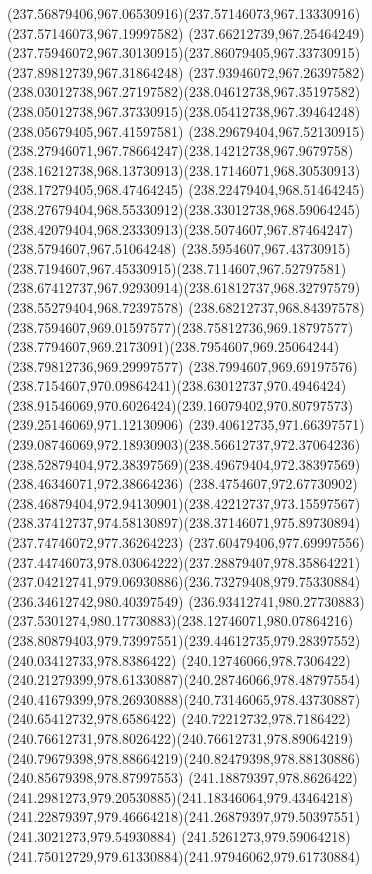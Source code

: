 {{  \curveto(237.56879406,967.06530916)(237.57146073,967.13330916)(237.57146073,967.19997582)
  \curveto(237.66212739,967.25464249)(237.75946072,967.30130915)(237.86079405,967.33730915)
  \lineto(237.89812739,967.31864248)
  \curveto(237.93946072,967.26397582)(238.03012738,967.27197582)(238.04612738,967.35197582)
  \curveto(238.05012738,967.37330915)(238.05412738,967.39464248)(238.05679405,967.41597581)
  \curveto(238.29679404,967.52130915)(238.27946071,967.78664247)(238.14212738,967.9679758)
  \curveto(238.16212738,968.13730913)(238.17146071,968.30530913)(238.17279405,968.47464245)
  \curveto(238.22479404,968.51464245)(238.27679404,968.55330912)(238.33012738,968.59064245)
  \curveto(238.42079404,968.23330913)(238.5074607,967.87464247)(238.5794607,967.51064248)
  \curveto(238.5954607,967.43730915)(238.7194607,967.45330915)(238.7114607,967.52797581)
  \curveto(238.67412737,967.92930914)(238.61812737,968.32797579)(238.55279404,968.72397578)
  \curveto(238.68212737,968.84397578)(238.7594607,969.01597577)(238.75812736,969.18797577)
  \curveto(238.7794607,969.2173091)(238.7954607,969.25064244)(238.79812736,969.29997577)
  \curveto(238.7994607,969.69197576)(238.7154607,970.09864241)(238.63012737,970.4946424)
  \curveto(238.91546069,970.6026424)(239.16079402,970.80797573)(239.25146069,971.12130906)
  \curveto(239.40612735,971.66397571)(239.08746069,972.18930903)(238.56612737,972.37064236)
  \curveto(238.52879404,972.38397569)(238.49679404,972.38397569)(238.46346071,972.38664236)
  \curveto(238.4754607,972.67730902)(238.46879404,972.94130901)(238.42212737,973.15597567)
  \curveto(238.37412737,974.58130897)(238.37146071,975.89730894)(237.74746072,977.36264223)
  \curveto(237.60479406,977.69997556)(237.44746073,978.03064222)(237.28879407,978.35864221)
  \curveto(237.04212741,979.06930886)(236.73279408,979.75330884)(236.34612742,980.40397549)
  \curveto(236.93412741,980.27730883)(237.5301274,980.17730883)(238.12746071,980.07864216)
  \curveto(238.80879403,979.73997551)(239.44612735,979.28397552)(240.03412733,978.8386422)
  \curveto(240.12746066,978.7306422)(240.21279399,978.61330887)(240.28746066,978.48797554)
  \curveto(240.41679399,978.26930888)(240.73146065,978.43730887)(240.65412732,978.6586422)
  \curveto(240.72212732,978.7186422)(240.76612731,978.8026422)(240.76612731,978.89064219)
  \curveto(240.79679398,978.88664219)(240.82479398,978.88130886)(240.85679398,978.87997553)
  \curveto(241.18879397,978.8626422)(241.2981273,979.20530885)(241.18346064,979.43464218)
  \curveto(241.22879397,979.46664218)(241.26879397,979.50397551)(241.3021273,979.54930884)
  \curveto(241.5261273,979.59064218)(241.75012729,979.61330884)(241.97946062,979.61730884)
}}
